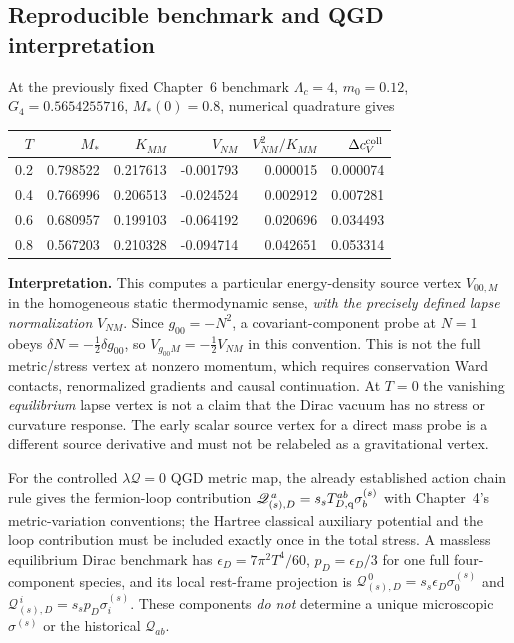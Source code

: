 \documentclass[11pt,a4paper]{article}
\theoremstyle{remark}\newtheorem{remark}[theorem]{Remark}
\begin{document}
\subsection{Reproducible benchmark and QGD interpretation}
At the previously fixed Chapter~6 benchmark
$\Lambda_c=4$, $m_0=0.12$, $G_4=0.5654255716$,
$M_*(0)=0.8$, numerical quadrature gives
\begin{center}\small
\begin{tabular}{@{}rrrrrr@{}}\toprule
$T$ & $M_*$ & $K_{MM}$ & $V_{NM}$ & $V_{NM}^2/K_{MM}$ & $\Delta c_V^{\rm coll}$\\\midrule
0.2 & 0.798522 & 0.217613 & -0.001793 & 0.000015 & 0.000074\\
0.4 & 0.766996 & 0.206513 & -0.024524 & 0.002912 & 0.007281\\
0.6 & 0.680957 & 0.199103 & -0.064192 & 0.020696 & 0.034493\\
0.8 & 0.567203 & 0.210328 & -0.094714 & 0.042651 & 0.053314\\\bottomrule
\end{tabular}
\end{center}
\textbf{Interpretation.} This computes a particular energy-density
source vertex $V_{00,M}$ in the homogeneous static thermodynamic sense,
\emph{with the precisely defined lapse normalization} $V_{NM}$.
Since $g_{00}=-N^2$, a covariant-component probe at $N=1$ obeys
$\delta N=-\tfrac12\delta g_{00}$, so
$V_{g_{00}M}=-\tfrac12 V_{NM}$ in this convention.
This is not the full metric/stress vertex at nonzero momentum, which
requires conservation Ward contacts, renormalized gradients and causal
continuation. At $T=0$ the vanishing \emph{equilibrium} lapse vertex
is not a claim that the Dirac vacuum has no stress or curvature response.
The early scalar source vertex for a direct mass probe is a different
source derivative and must not be relabeled as a gravitational vertex.

For the controlled $\lambda\mathcal Q=0$ QGD metric map, the
already established action chain rule gives the fermion-loop contribution
$\mathscr Q_{(s),D}^{\,a}=s_sT_{D,\rm q}^{ab}\sigma_b^{(s)}$
with Chapter~4's metric-variation conventions; the Hartree classical
auxiliary potential and the loop contribution must be included exactly
once in the total stress. A massless equilibrium Dirac benchmark has
$\epsilon_D=7\pi^2T^4/60$, $p_D=\epsilon_D/3$ for one full
four-component species, and its local rest-frame projection is
$\mathscr Q_{(s),D}^{\,0}=s_s\epsilon_D\sigma_0^{(s)}$ and
$\mathscr Q_{(s),D}^{\,i}=s_s p_D\sigma_i^{(s)}$.
These components \emph{do not} determine a unique microscopic
$\sigma^{(s)}$ or the historical $\mathcal Q_{ab}$.
\end{document}
